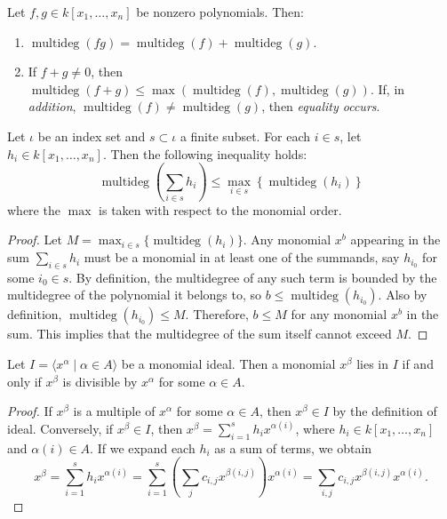 \begin{lemma}\label{lem:degree_sum_le} %
  \leanok %
  Let $f, g \in k[x_1, \dots, x_n]$ be nonzero polynomials. Then:
  \begin{enumerate}
      \item $\operatorname{multideg}(fg) = \operatorname{multideg}(f) + \operatorname{multideg}(g)$.
      \item If $f + g \neq 0$, then $\operatorname{multideg}(f + g) \le \max(\operatorname{multideg}(f), \operatorname{multideg}(g))$. 
        If, in \textit{addition}, $\operatorname{multideg}(f) \neq \operatorname{multideg}(g)$, then \textit{equality occurs}.
  \end{enumerate}
\end{lemma}

\begin{lemma}\label{lem:degree_sum_le_syn}
  \leanok %
  Let $\iota$ be an index set and $s \subset \iota$ a finite subset. For each $i \in s$, let $h_i \in k[x_1,\dots,x_n]$. 
  Then the following inequality holds:
  \[
  \operatorname{multideg}\left(\sum_{i \in s} h_i\right) \le \max_{i \in s} \left\{ \operatorname{multideg}(h_i) \right\}
  \]
  where the $\max$ is taken with respect to the monomial order.
\end{lemma}
\begin{proof}
  \leanok
  Let $M = \max_{i \in s} \{ \operatorname{multideg}(h_i) \}$. 
  Any monomial $x^b$ appearing in the sum $\sum_{i \in s} h_i$ must be a monomial in at least one of the summands, say $h_{i_0}$ for some $i_0 \in s$.
  By definition, the multidegree of any such term is bounded by the multidegree of the polynomial it belongs to, so $b \le \operatorname{multideg}(h_{i_0})$.
  Also by definition, $\operatorname{multideg}(h_{i_0}) \le M$.
  Therefore, $b \le M$ for any monomial $x^b$ in the sum. This implies that the multidegree of the sum itself cannot exceed $M$.
\end{proof}

\begin{lemma}\label{lem:mem_monomialIdeal_iff_divisible} %
    \leanok %
    Let $I = \langle x^\alpha \mid \alpha \in A \rangle$ be a monomial ideal.
    Then a monomial $x^\beta$ lies in $I$ if and only if $x^\beta$ is divisible by $x^\alpha$ for some $\alpha \in A$.
\end{lemma}
\begin{proof}
  \leanok
  If $x^\beta$ is a multiple of $x^\alpha$ for some $\alpha \in A$, then $x^\beta \in I$ by the definition of ideal. 
  Conversely, if $x^\beta \in I$, then $x^\beta = \sum_{i=1}^s h_i x^{\alpha(i)}$, where $h_i \in k[x_1, \dots, x_n]$ and $\alpha(i) \in A$. 
  If we expand each $h_i$ as a sum of terms, we obtain
  \[
  x^\beta = \sum_{i=1}^s h_i x^{\alpha(i)} = \sum_{i=1}^s \left(\sum_j c_{i,j} x^{\beta(i,j)}\right) x^{\alpha(i)} = \sum_{i,j} c_{i,j} x^{\beta(i,j)} x^{\alpha(i)}.
  \]
\end{proof}

